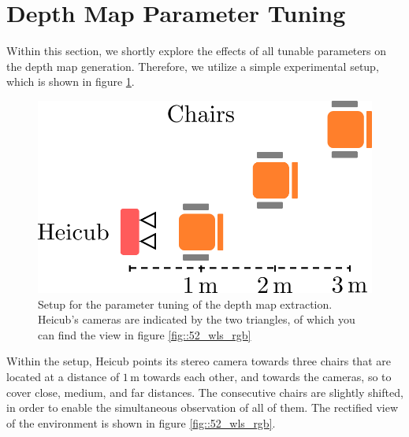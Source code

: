 \section{Depth Map Parameter Tuning}
\label{sec::52_dm}
Within this section, we shortly explore the effects of all tunable parameters on the depth map generation. Therefore, we utilize a simple experimental setup, which is shown in figure \ref{fig::52_wls_setup}.
\begin{figure}[h]
	\centering
	\includegraphics[scale=.4]{chapters/05_experiments/img/wls_setup.png}
	\caption{Setup for the parameter tuning of the depth map extraction. Heicub's cameras are indicated by the two triangles, of which you can find the view in figure \ref{fig::52_wls_rgb}}
	\label{fig::52_wls_setup}
\end{figure}
Within the setup, Heicub points its stereo camera towards three chairs that are located at a distance of $1\,\text{m}$ towards each other, and towards the cameras, so to cover close, medium, and far distances. The consecutive chairs are slightly shifted, in order to enable the simultaneous observation of all of them. The rectified view of the environment is shown in figure \ref{fig::52_wls_rgb}.
